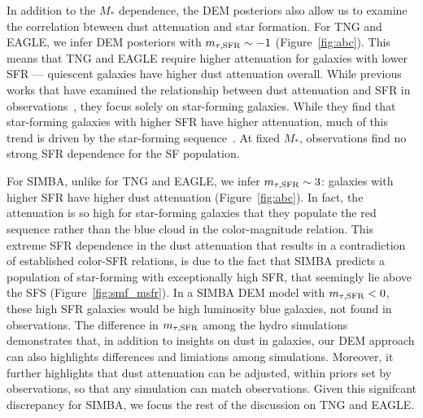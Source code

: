 In addition to the $M_*$ dependence, the DEM posteriors also allow us to
examine the correlation bteween dust attenuation and star formation. For TNG
and EAGLE, we infer DEM posteriors with $m_{\tau,{\rm SFR}}\sim-1$ (Figure~\ref{fig:abc}). 
This means that TNG and EAGLE require higher attenuation for galaxies with
lower SFR --- \ie quiescent galaxies have higher dust attenuation overall.
While previous works that have examined the relationship between dust attenuation
and SFR in observations~\citep[\eg][]{garn2010, reddy2015, battisti2016,
battisti2017}, they focus solely on star-forming galaxies. While they find that
star-forming galaxies with higher SFR have higher attenuation, much of this
trend is driven by the star-forming sequence~\citep[more massive star-forming
galaxies have higher SFR;][]{garn2010, battisti2017}. At fixed $M_*$,
observations find no strong SFR dependence for the SF population. 

For SIMBA, unlike for TNG and EAGLE, we infer $m_{\tau,{\rm SFR}}\sim 3$: galaxies with
higher SFR have higher dust attenuation (Figure~\ref{fig:abc}). In fact, the
attenuation is so high for star-forming galaxies that they populate the red
sequence rather than the blue cloud in the color-magnitude relation. This
extreme SFR dependence in the dust attenuation that results in a contradiction of
established color-SFR relations, is due to the fact that SIMBA predicts a population of
star-forming with exceptionally high SFR, that seemingly lie above the SFS
(Figure~\ref{fig:smf_msfr}). In a SIMBA DEM model with $m_{\tau,{\rm SFR}} < 0$, these high
SFR galaxies would be high luminosity blue galaxies, not found in observations. 
 The difference in $m_{\tau,{\rm SFR}}$ 
among the hydro simulations demonstrates that, in addition to insights on dust
in galaxies, our DEM approach can also highlights differences and limiations among 
simulations. Moreover, it further highlights that dust attenuation can be
adjusted, within priors set by observations, so that any simulation can 
match observations. Given this signifcant discrepancy for SIMBA, we focus 
the rest of the discussion on TNG and EAGLE.


